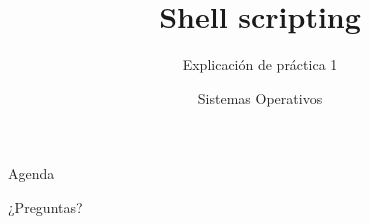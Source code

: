 


\title{Shell scripting}
\author{Sistemas Operativos}
\subtitle{Explicación de práctica 1}



\begin{frame}
  \titlepage
\end{frame}

\begin{frame}{Agenda}
  \tableofcontents
\end{frame}





\begin{frame}{}
  \begin{center}
    \vfill
    \huge ¿Preguntas?
    \vfill
  \end{center}
\end{frame}


